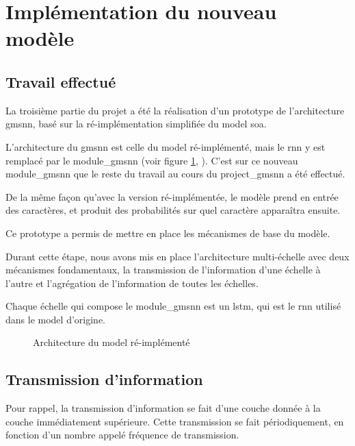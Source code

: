 \section{Implémentation du nouveau modèle}
\subsection{Travail effectué}\label{def:lstm_2}
La troisième partie du projet a été la réalisation d'un prototype de l'architecture \gls{gmsnn}, basé sur la ré-implémentation simplifiée du \gls{model} \gls{soa}.

L'architecture du \gls{gmsnn} est celle du \gls{model} ré-implémenté, mais le \gls{rnn} y est remplacé par le \gls{module_gmsnn} (voir figure \ref{fig:reimplement_gmsnn}, ). C'est sur ce nouveau \gls{module_gmsnn} que le reste du travail au cours du \gls{project_gmsnn} a été effectué.

De la même façon qu'avec la version ré-implémentée, le modèle prend en entrée des caractères, et produit des probabilités sur quel caractère apparaîtra ensuite.

Ce prototype a permis de mettre en place les mécanismes de base du modèle.

Durant cette étape, nous avons mis en place l'architecture multi-échelle avec deux mécanismes fondamentaux, la transmission de l'information d'une échelle à l'autre et l'agrégation de l'information de toutes les échelles.

Chaque échelle qui compose le \gls{module_gmsnn} est un \gls{lstm}, qui est le \gls{rnn} utilisé dans le \gls{model} d'origine.

\begin{figure}[ht]
	\centering
	\scalebox{1}{}
	\caption[Architecture du  ré-implémenté]{Architecture du \gls{model} ré-implémenté}\label{fig:reimplement_gmsnn}
\end{figure} 

\pagebreak
\subsection{Transmission d'information}
Pour rappel, la transmission d'information se fait d'une couche donnée à la couche immédiatement supérieure.
Cette transmission se fait périodiquement, en fonction d'un nombre appelé fréquence de transmission.



